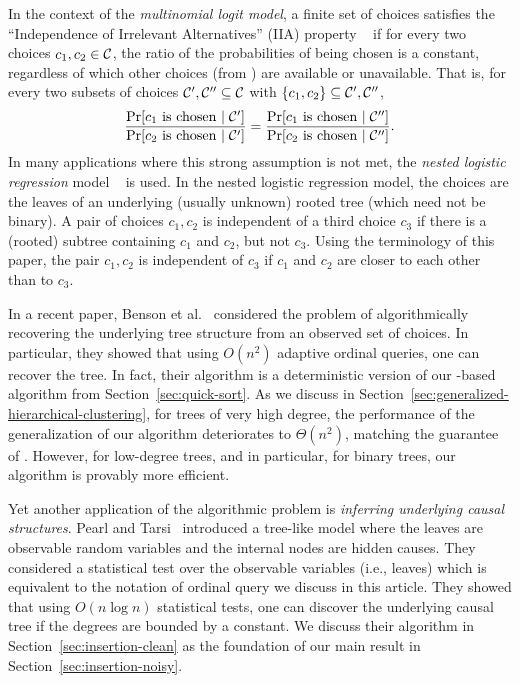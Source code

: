 In the context of the \emph{multinomial logit model},
a finite set of choices \CCC satisfies the
``Independence of Irrelevant Alternatives'' (IIA) property%
~\cite{McFadden-tye-train:1977:multinomial-logit}
if for every two choices $c_1, c_2 \in \mathcal{C}$,
the ratio of the probabilities of being chosen
is a constant, regardless of which other choices (from \CCC)
are available or unavailable. That is,
for every two subsets of choices $\mathcal{C}', \mathcal{C}'' \subseteq \mathcal{C}$
with $\{ c_1, c_2 \} \subseteq \mathcal{C}', \mathcal{C}''$,
\begin{align*}
\frac{\Pr[c_1 \text{ is chosen } | \; \mathcal{C}']}
{\Pr[c_2 \text{ is chosen } | \; \mathcal{C}']} =
\frac{\Pr[c_1 \text{ is chosen } | \; \mathcal{C}'']}
{\Pr[c_2 \text{ is chosen } | \; \mathcal{C}'']}.
\end{align*}
In many applications where this strong assumption is not met,
the \emph{nested logistic regression} model%
~\cite{benson-kumar-tomkins:2016:nested-IIA} is used.
In the nested logistic regression model,
the choices are the leaves of an underlying (usually unknown) rooted tree
(which need not be binary).
A pair of choices $c_1, c_2$ is independent
of a third choice $c_3$
if there is a (rooted) subtree containing $c_1$ and $c_2$, but not $c_3$.
Using the terminology of this paper,
the pair $c_1, c_2$ is independent of $c_3$ if
$c_1$ and $c_2$ are closer to each other than to $c_3$.

In a recent paper,
Benson et al.~\cite{benson-kumar-tomkins:2016:nested-IIA}
considered the problem of algorithmically recovering
the underlying tree structure from an observed set of choices.
In particular, they showed that using $O(n^2)$ adaptive ordinal queries,
one can recover the tree.
In fact, their algorithm is a deterministic version
of our \QuickSort-based algorithm from Section~\ref{sec:quick-sort}.
As we discuss in Section~\ref{sec:generalized-hierarchical-clustering},
for trees of very high degree,
the performance of the generalization of our algorithm
deteriorates to $\Theta(n^2)$,
matching the guarantee of
\cite{benson-kumar-tomkins:2016:nested-IIA}.
However, for low-degree trees, and in particular,
for binary trees, our algorithm is provably more efficient.

Yet another application of the algorithmic problem
is \emph{inferring underlying causal structures}.
Pearl and Tarsi~\cite{pearl-tarsi:1986:strucuting}
introduced a tree-like model
where the leaves are observable random variables
and the internal nodes are hidden causes.
They considered a statistical test over the observable variables
(i.e., leaves) which is equivalent to the notation of ordinal query
we discuss in this article.
They showed that using $O(n \log n)$ statistical tests,
one can discover the underlying causal tree
if the degrees are bounded by a constant.
We discuss their algorithm in Section~\ref{sec:insertion-clean}
as the foundation of our main result in Section~\ref{sec:insertion-noisy}.

